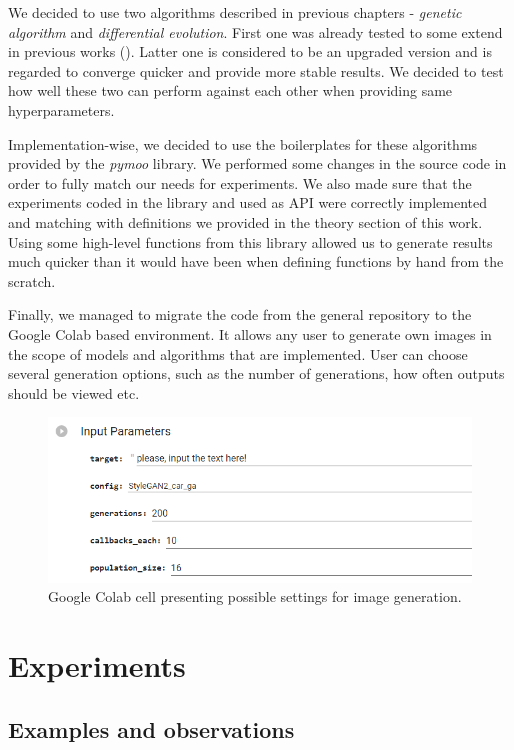 \documentclass[11pt,a4paper,openany]{book}
\begin{document}
\noindent We decided to use two algorithms described in previous chapters - \textit{genetic algorithm} and \textit{differential evolution}. First one was already tested to some extend in previous works (\cite{coimbra}). Latter one is considered to be an upgraded version and is regarded to converge quicker and provide more stable results. We decided to test how well these two can perform against each other when providing same hyperparameters.

\noindent Implementation-wise, we decided to use the boilerplates for these algorithms provided by the \textit{pymoo} \cite{pymoo} library. We performed some changes in the source code in order to fully match our needs for experiments. We also made sure that the experiments coded in the library and used as API were correctly implemented and matching with definitions we provided in the theory section of this work. Using some high-level functions from this library allowed us to generate results much quicker than it would have been when defining functions by hand from the scratch.

\noindent Finally, we managed to migrate the code from the general repository to the Google Colab based environment. It allows any user to generate own images in the scope of models and algorithms that are implemented. User can choose several generation options, such as the number of generations, how often outputs should be viewed etc.

\begin{figure}[H]
    \centering
    \includegraphics[scale=0.8]{figs/collab.png}
    \caption{Google Colab cell presenting possible settings for image generation.}\label{Fig:collab}
\end{figure}


\chapter{Experiments}

\section{Examples and observations}
\end{document}
